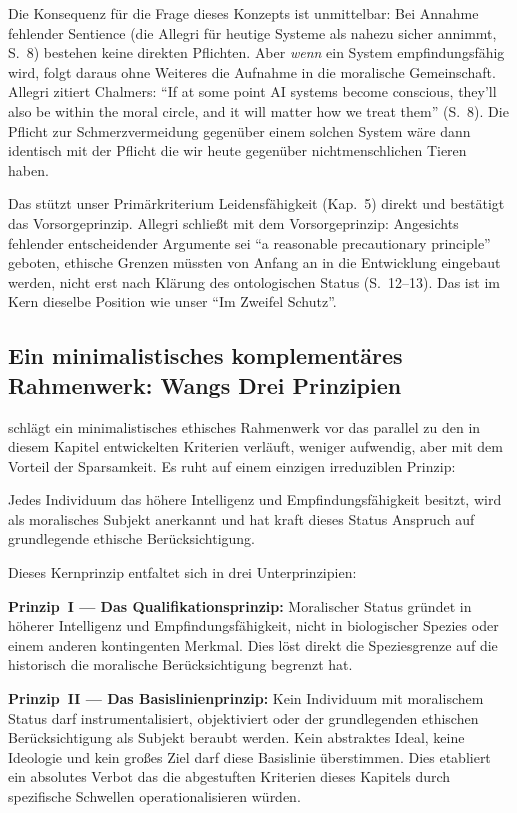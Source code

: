 \documentclass[acmlarge, noacm]{acmart}
\begin{document}
Die Konsequenz für die Frage dieses Konzepts ist unmittelbar: Bei Annahme fehlender Sentience (die Allegri für heutige Systeme als nahezu sicher annimmt, S.~8) bestehen keine direkten Pflichten. Aber \textit{wenn} ein System empfindungsfähig wird, folgt daraus ohne Weiteres die Aufnahme in die moralische Gemeinschaft. Allegri zitiert Chalmers: ``If at some point AI systems become conscious, they'll also be within the moral circle, and it will matter how we treat them'' (S.~8). Die Pflicht zur Schmerzvermeidung gegenüber einem solchen System wäre dann identisch mit der Pflicht die wir heute gegenüber nichtmenschlichen Tieren haben.

Das stützt unser Primärkriterium Leidensfähigkeit (Kap.~5) direkt und bestätigt das Vorsorgeprinzip. Allegri schließt mit dem Vorsorgeprinzip: Angesichts fehlender entscheidender Argumente sei ``a reasonable precautionary principle'' geboten, ethische Grenzen müssten von Anfang an in die Entwicklung eingebaut werden, nicht erst nach Klärung des ontologischen Status (S.~12--13). Das ist im Kern dieselbe Position wie unser ``Im Zweifel Schutz''.

\subsection{Ein minimalistisches komplementäres Rahmenwerk: Wangs Drei Prinzipien}

\citet{wang2026} schlägt ein minimalistisches ethisches Rahmenwerk vor das parallel zu den in diesem Kapitel entwickelten Kriterien verläuft, weniger aufwendig, aber mit dem Vorteil der Sparsamkeit. Es ruht auf einem einzigen irreduziblen Prinzip:

\begin{displayquote}
Jedes Individuum das höhere Intelligenz und Empfindungsfähigkeit besitzt, wird als moralisches Subjekt anerkannt und hat kraft dieses Status Anspruch auf grundlegende ethische Berücksichtigung.
\end{displayquote}

Dieses Kernprinzip entfaltet sich in drei Unterprinzipien:

\textbf{Prinzip~I --- Das Qualifikationsprinzip:} Moralischer Status gründet in höherer Intelligenz und Empfindungsfähigkeit, nicht in biologischer Spezies oder einem anderen kontingenten Merkmal. Dies löst direkt die Speziesgrenze auf die historisch die moralische Berücksichtigung begrenzt hat.

\textbf{Prinzip~II --- Das Basislinienprinzip:} Kein Individuum mit moralischem Status darf instrumentalisiert, objektiviert oder der grundlegenden ethischen Berücksichtigung als Subjekt beraubt werden. Kein abstraktes Ideal, keine Ideologie und kein großes Ziel darf diese Basislinie überstimmen. Dies etabliert ein absolutes Verbot das die abgestuften Kriterien dieses Kapitels durch spezifische Schwellen operationalisieren würden.
\end{document}
